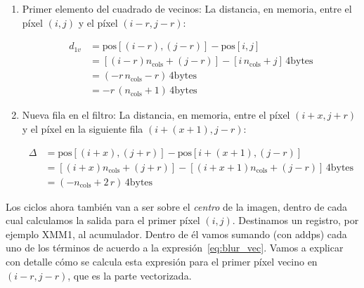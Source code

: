 \begin{enumerate}
\item Primer elemento del cuadrado de vecinos: La distancia, en
  memoria, entre el píxel $(i, j)$ y el píxel $(i - r, j - r)$:

  \begin{align}
    d_{1v} &= \text{pos}[(i - r), (j - r)] - \text{pos}[i, j] \\
           &= [(i - r) n_{\text{cols}} + (j - r)] - [i\,
             n_{\text{cols}} + j]\, 4\text{bytes} \\
           &= (-r\, n_{\text{cols}} - r)\, 4\text{bytes}\\ 
           &= -r\, (n_{\text{cols}} + 1)\, 4\text{bytes}
  \end{align}

\item Nueva fila en el filtro: La distancia, en memoria, entre el
  píxel $(i + x, j + r)$ y el píxel en la siguiente fila $(i + (x +
  1), j - r)$:

  \begin{align}
    \Delta &= \text{pos}[(i + x), (j + r)] - \text{pos}[i + (x + 1), (j
             - r)] \\
           &= [(i + x) n_{\text{cols}} + (j + r)] - [(i + x + 1)
             n_{\text{cols}} + (j - r)]\,4 \text{bytes} \\
           &= (-n_\text{cols} + 2\, r) \,4 \text{bytes}
  \end{align}
\end{enumerate}

Los ciclos ahora también van a ser sobre el \emph{centro} de la
imagen, dentro de cada cual calculamos la salida para el primer píxel
$(i, j)$. Destinamos un registro, por ejemplo {\ttfamily XMM1}, al
acumulador. Dentro de él vamos sumando (con {\ttfamily addps}) cada
uno de los términos de acuerdo a la expresión~\ref{eq:blur_vec}. Vamos
a explicar con detalle cómo se calcula esta expresión para el primer píxel
vecino en $(i - r, j - r)$, que es la parte vectorizada.

